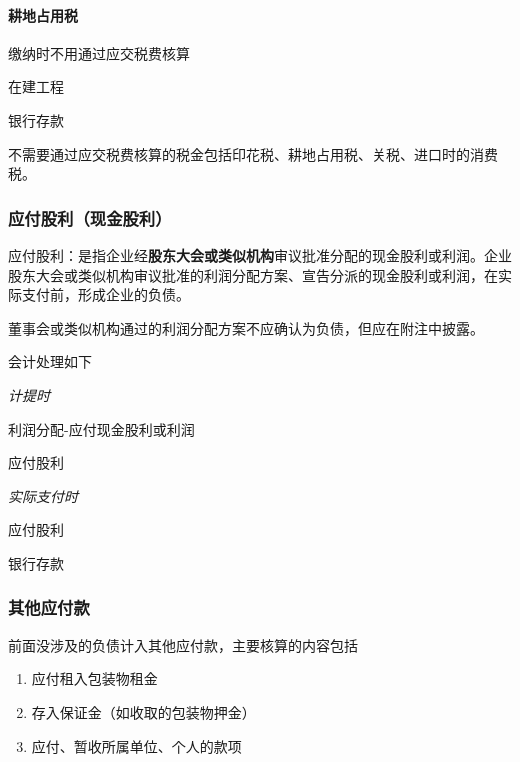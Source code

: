 \documentclass[UTF8,12pt]{ctexart}
\newenvironment{Dr}{%
	\begin{list}{}%
		{
			\setlength{\leftmargin}{2em}
			\setlength{\labelwidth}{2em}
			\setlength{\labelsep}{0pt}
			\setlength{\itemindent}{0pt}
			\setlength{\listparindent}{0pt}
			\setlength{\parsep}{0pt}
			\setlength{\topsep}{0pt}
		}
		\item[\textbf{借：}]
	}{%
	\end{list}
}
\newenvironment{Cr}{%
	\begin{list}{}%
		{
			\setlength{\leftmargin}{2em}
			\setlength{\labelwidth}{2em}
			\setlength{\labelsep}{0pt}
			\setlength{\itemindent}{0pt}
			\setlength{\listparindent}{0pt}
			\setlength{\parsep}{0pt}
			\setlength{\topsep}{0pt}
		}
		\item[\textbf{贷：}]
	}{%
	\end{list}
}
\numberwithin{equation}{section} %
\numberwithin{figure}{section}
\numberwithin{table}{section}
\begin{document}
	\paragraph{耕地占用税}
	缴纳时不用通过应交税费核算
	
	\begin{Dr}
		在建工程
	\end{Dr}
	\begin{Cr}
		银行存款
	\end{Cr}

	不需要通过应交税费核算的税金包括印花税、耕地占用税、关税、进口时的消费税。
	
	\subsubsection{应付股利（现金股利）}
	应付股利：是指企业经\textbf{股东大会或类似机构}审议批准分配的现金股利或利润。企业股东大会或类似机构审议批准的利润分配方案、宣告分派的现金股利或利润，在实际支付前，形成企业的负债。
	
	董事会或类似机构通过的利润分配方案不应确认为负债，但应在附注中披露。
	
	会计处理如下
	
	\textit{计提时}
	
	\begin{Dr}
		利润分配-应付现金股利或利润
	\end{Dr}
	\begin{Cr}
		应付股利
	\end{Cr}

	\textit{实际支付时}
	
	\begin{Dr}
		应付股利
	\end{Dr}
	\begin{Cr}
		银行存款
	\end{Cr}
	
	\subsubsection{其他应付款}
	前面没涉及的负债计入其他应付款，主要核算的内容包括
	\begin{enumerate}
		\item 应付租入包装物租金
		
		\item 存入保证金（如收取的包装物押金）
		
		\item 应付、暂收所属单位、个人的款项
	\end{enumerate}
	
\end{document}
